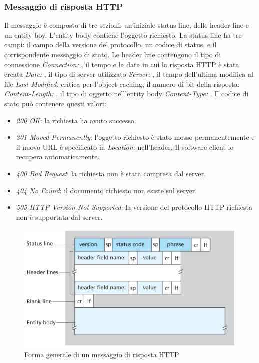 \subsubsection{Messaggio di risposta HTTP}
Il messaggio \`e composto di tre sezioni: un'iniziale status line, delle header line e un entity boy. L'entity body contiene l'oggetto richiesto. La status line ha tre campi: il campo della versione del protocollo, un
codice di status, e il corrispondente messaggio di stato.  Le header line contengono il tipo di connessione \emph{Connection: }, il tempo e la data in cui la risposta HTTP \`e stata creata \emph{Date: }, il tipo di 
server utilizzato \emph{Server: }, il tempo dell'ultima modifica al file \emph{Last-Modified: } critica per l'object-caching, il numero di bit della risposta: \emph{Content-Length: }, il tipo di oggetto nell'entity 
body \emph{Content-Type: }. Il codice di stato pu\`o contenere questi valori:
\begin{itemize}
\item \emph{200 OK}: la richiesta ha avuto successo.
\item \emph{301 Moved Permanently}: l'oggetto richiesto \`e stato mosso permanentemente e il nuovo URL \`e specificato in \emph{Location: } nell'header. Il software client lo recupera automaticamente.
\item \emph{400 Bad Request}: la richiesta non \`e stata compresa dal server.
\item \emph{404 No Found}: il documento richiesto non esiste sul server.
\item \emph{505 HTTP Version Not Supported}: la versione del protocollo HTTP richiesta non \`e supportata dal server.
\end{itemize}
\begin{figure}
\includegraphics[width=\textwidth]{HTTPResponseMessage.png}
\caption{Forma generale di un messaggio di risposta HTTP}
\end{figure}

